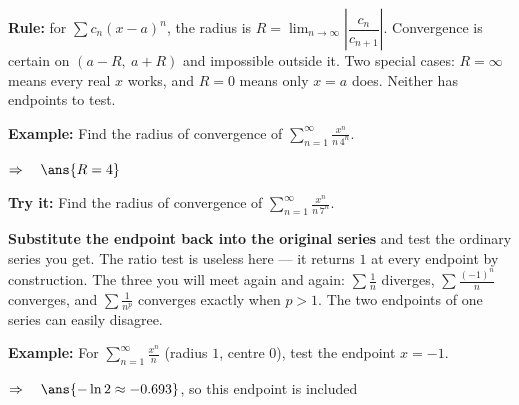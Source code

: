 \documentclass[12pt]{article}
\begin{document}


\begin{formulabox}
\textbf{Rule:} for $\sum c_{n}(x-a)^{n}$, the radius is $R = \lim_{n\to\infty}\left|\dfrac{c_{n}}{c_{n+1}}\right|$. Convergence is certain on $(a-R,\ a+R)$ and impossible outside it. Two special cases: $R = \infty$ means every real $x$ works, and $R = 0$ means only $x = a$ does. Neither has endpoints to test.
\end{formulabox}

\begin{examplebox}
\textbf{Example:} \quad Find the radius of convergence of $\displaystyle\sum_{n=1}^{\infty}\frac{x^{n}}{n\,4^{n}}$.

$\Rightarrow\quad \ans{R = 4}$
\end{examplebox}

\begin{tryitbox}
\textbf{Try it:} \quad Find the radius of convergence of $\displaystyle\sum_{n=1}^{\infty}\frac{x^{n}}{n\,7^{n}}$.\\[2pt]
\end{tryitbox}


\begin{formulabox}
\textbf{Substitute the endpoint back into the original series} and test the ordinary series you get. The ratio test is useless here --- it returns $1$ at every endpoint by construction. The three you will meet again and again: $\sum \frac1n$ diverges, $\sum \frac{(-1)^n}{n}$ converges, and $\sum \frac{1}{n^p}$ converges exactly when $p>1$. The two endpoints of one series can easily disagree.
\end{formulabox}

\begin{examplebox}
\textbf{Example:} \quad For $\displaystyle\sum_{n=1}^{\infty}\frac{x^{n}}{n}$ (radius $1$, centre $0$), test the endpoint $x = -1$.

$\Rightarrow\quad \ans{-\ln 2 \approx -0.693}$, so this endpoint is included
\end{examplebox}
\end{document}
